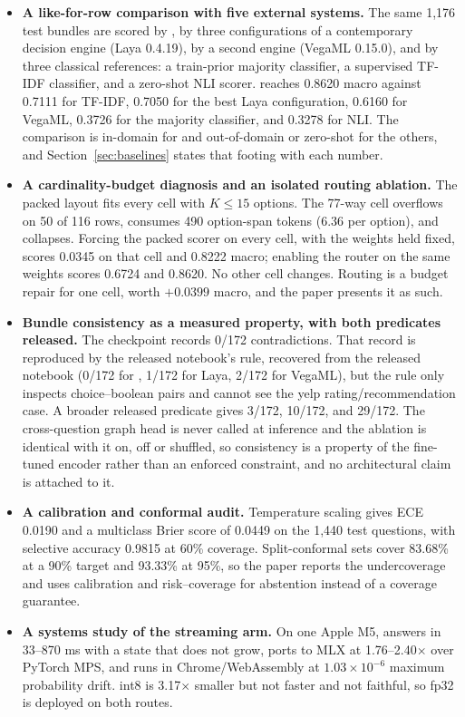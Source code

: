\begin{itemize}
\item \textbf{A like-for-row comparison with five external systems.} The same 1{,}176 test
bundles are scored by \vsix{}, by three configurations of a contemporary decision engine
(Laya 0.4.19), by a second engine (VegaML 0.15.0), and by three classical references: a
train-prior majority classifier, a supervised TF-IDF classifier, and a zero-shot NLI scorer.
\vsix{} reaches 0.8620 macro against 0.7111 for TF-IDF, 0.7050 for the best Laya configuration,
0.6160 for VegaML, 0.3726 for the majority classifier, and 0.3278 for NLI. The comparison is
in-domain for \vsix{} and out-of-domain or zero-shot for the others, and
Section~\ref{sec:baselines} states that footing with each number.
\item \textbf{A cardinality-budget diagnosis and an isolated routing ablation.} The packed
layout fits every cell with $K\le15$ options. The 77-way cell overflows on 50 of 116 rows,
consumes 490 option-span tokens (6.36 per option), and collapses. Forcing the packed scorer on
every cell, with the weights held fixed, scores 0.0345 on that cell and 0.8222 macro; enabling
the router on the same weights scores 0.6724 and 0.8620. No other cell changes. Routing is a
budget repair for one cell, worth $+0.0399$ macro, and the paper presents it as such.
\item \textbf{Bundle consistency as a measured property, with both predicates released.} The
checkpoint records 0/172 contradictions. That record is reproduced by the released notebook's rule,
recovered from the released notebook (0/172 for \vsix{}, 1/172 for Laya, 2/172 for VegaML), but
the rule only inspects choice--boolean pairs and cannot see the yelp rating/recommendation case. A
broader released predicate gives 3/172, 10/172, and 29/172. The
cross-question graph head is never called at inference and the ablation is identical with it on,
off or shuffled, so consistency is a property of the fine-tuned encoder rather than an enforced
constraint, and no architectural claim is attached to it.
\item \textbf{A calibration and conformal audit.} Temperature scaling gives ECE 0.0190 and a
multiclass Brier score of 0.0449 on the 1{,}440 test questions, with selective accuracy 0.9815 at
60\% coverage. Split-conformal sets cover 83.68\% at a 90\% target and 93.33\% at 95\%, so the
paper reports the undercoverage and uses calibration and risk--coverage for abstention instead of
a coverage guarantee.
\item \textbf{A systems study of the streaming arm.} On one Apple M5, \stream{} answers in
33--870 ms with a state that does not grow, ports to MLX at 1.76--2.40$\times$ over PyTorch MPS,
and runs in Chrome/WebAssembly at $1.03\times10^{-6}$ maximum probability drift. int8 is 3.17$\times$
smaller but not faster and not faithful, so fp32 is deployed on both routes.
\end{itemize}

